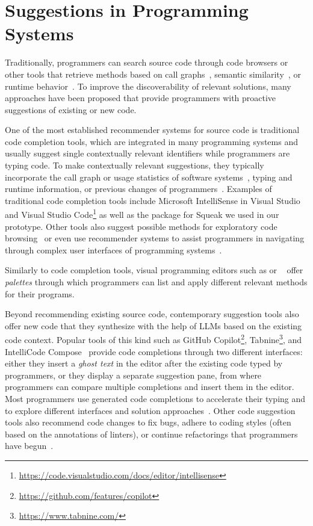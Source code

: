 
\section{Suggestions in Programming Systems}
\label{sec:related_work/suggestions}

Traditionally, programmers can search source code through code browsers or other tools that retrieve methods based on call graphs~\cites[chap.~10]{goldberg1984smalltalk}[sec.~6.2]{kraemer2010stacksplorer}{thiede2023squeak}, semantic similarity~\cite{husain2020codesearchnet}, or runtime behavior~\cite[sec.~1.8]{thiede2023squeak}.
To improve the discoverability of relevant solutions, many approaches have been proposed that provide programmers with proactive suggestions of existing or new code.

One of the most established recommender systems for source code is traditional code completion tools, which are integrated in many programming systems and usually suggest single contextually relevant identifiers while programmers are typing code.
To make contextually relevant suggestions, they typically incorporate the call graph or usage statistics of software systems~\cite{thiede2022augmenting}, typing and runtime information, or previous changes of programmers~\cite{robbes2008program}.
Examples of traditional code completion tools include Microsoft IntelliSense in Visual Studio and Visual Studio Code\footnote{\url{https://code.visualstudio.com/docs/editor/intellisense}} as well as the  package for Squeak we used in our prototype.
Other tools also suggest possible methods for exploratory code browsing~\cite{robillard2005automatic,bruch2006fruit} or even use recommender systems to assist programmers in navigating through complex user interfaces of programming systems~\cite{murphy2012improving}.

Similarly to code completion tools, visual programming editors such as  or ~\cite{resnick2009scratch} offer \emph{palettes} through which programmers can list and apply different relevant methods for their programs.

Beyond recommending existing source code, contemporary suggestion tools also offer new code that they synthesize with the help of LLMs based on the existing code context.
Popular tools of this kind such as GitHub Copilot\footnote{\url{https://github.com/features/copilot}}, Tabnine\footnote{\url{https://www.tabnine.com/}}, and IntelliCode Compose~\cite{svyatkovskiy2020intellicode} provide code completions through two different interfaces:
either they insert a \emph{ghost text} in the editor after the existing code typed by programmers, or they display a separate suggestion pane, from where programmers can compare multiple completions and insert them in the editor.
Most programmers use generated code completions to accelerate their typing and to explore different interfaces and solution approaches~\cite{barka2023grounded}.
Other code suggestion tools also recommend code changes to fix bugs, adhere to coding styles (often based on the annotations of linters), or continue refactorings that programmers have begun~\cite{vaithilingam2023towards}.
